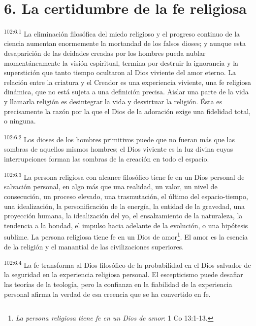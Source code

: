\documentclass[twoside, 11pt]{book}
\begin{document}
\section*{6. La certidumbre de la fe religiosa}
\par
\textsuperscript{102:6.1} La eliminación filosófica del miedo religioso y el progreso continuo de la ciencia aumentan enormemente la mortandad de los falsos dioses; y aunque esta desaparición de las deidades creadas por los hombres pueda nublar momentáneamente la visión espiritual, termina por destruir la ignorancia y la superstición que tanto tiempo ocultaron al Dios viviente del amor eterno. La relación entre la criatura y el Creador es una experiencia viviente, una fe religiosa dinámica, que no está sujeta a una definición precisa. Aislar una parte de la vida y llamarla religión es desintegrar la vida y desvirtuar la religión. Ésta es precisamente la razón por la que el Dios de la adoración exige una fidelidad total, o ninguna.

\par
\textsuperscript{102:6.2} Los dioses de los hombres primitivos puede que no fueran más que las sombras de aquellos mismos hombres; el Dios viviente es la luz divina cuyas interrupciones forman las sombras de la creación en todo el espacio.

\par
\textsuperscript{102:6.3} La persona religiosa con alcance filosófico tiene fe en un Dios personal de salvación personal, en algo más que una realidad, un valor, un nivel de consecución, un proceso elevado, una trasmutación, el último del espacio-tiempo, una idealización, la personificación de la energía, la entidad de la gravedad, una proyección humana, la idealización del yo, el ensalzamiento de la naturaleza, la tendencia a la bondad, el impulso hacia adelante de la evolución, o una hipótesis sublime. La persona religiosa tiene fe en un Dios de amor\footnote{\textit{La persona religiosa tiene fe en un Dios de amor}: 1 Co 13:1-13.}. El amor es la esencia de la religión y el manantial de las civilizaciones superiores.

\par
\textsuperscript{102:6.4} La fe transforma al Dios filosófico de la probabilidad en el Dios salvador de la seguridad en la experiencia religiosa personal. El escepticismo puede desafiar las teorías de la teología, pero la confianza en la fiabilidad de la experiencia personal afirma la verdad de esa creencia que se ha convertido en fe.
\end{document}
